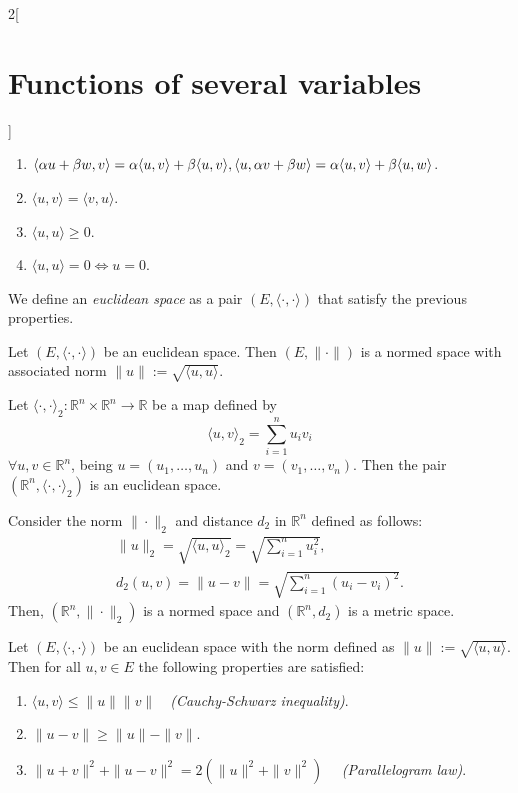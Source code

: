 \documentclass[class=article,10pt,crop=false]{standalone}
\begin{document}
\begin{multicols}{2}[\section{Functions of several variables}]
\begin{definition}
\begin{enumerate}
    \item $\langle \alpha u+\beta w,v\rangle=\alpha\langle u,v\rangle+\beta\langle u,v\rangle,\\\langle u,\alpha v+\beta w\rangle=\alpha\langle u,v\rangle+\beta\langle u,w\rangle$.
    \item $\langle u,v\rangle=\langle v,u\rangle$.
    \item $\langle u,u\rangle\geq 0$.
    \item $\langle u,u\rangle=0\iff u=0$.
\end{enumerate}
We define an \textit{euclidean space} as a pair $(E,\langle\cdot,\cdot\rangle)$ that satisfy the previous properties.
\end{definition}
\begin{prop}
Let $(E,\langle\cdot,\cdot\rangle)$ be an euclidean space. Then $(E,\|\cdot\|)$ is a normed space with associated norm $\|u\|:=\sqrt{\langle u,u\rangle}$.
\end{prop}
\begin{prop}
Let $\langle\cdot,\cdot\rangle_2:\mathbb{R}^n\times\mathbb{R}^n\rightarrow\mathbb{R}$ be a map defined by $$\langle u,v\rangle_2=\sum_{i=1}^nu_iv_i$$ $\forall u,v\in \mathbb{R}^n$, being $u=(u_1,\ldots,u_n)$ and $v=(v_1,\ldots,v_n)$. Then the pair $(\mathbb{R}^n,\langle\cdot,\cdot\rangle_2)$ is an euclidean space.
\end{prop}
\begin{corollary}
Consider the norm $\|\cdot\|_2$ and distance $d_2$ in $\mathbb{R}^n$ defined as follows:
\begin{gather*}
    \|u\|_2=\sqrt{\langle u,u\rangle_2}=\sqrt{\sum_{i=1}^nu_i^2},\\
    d_2(u,v)=\|u-v\|=\sqrt{\sum_{i=1}^n(u_i-v_i)^2}.
\end{gather*}
Then, $(\mathbb{R}^n,\|\cdot\|_2)$ is a normed space and $(\mathbb{R}^n,d_2)$ is a metric space.
\end{corollary}
\begin{prop}
Let $(E,\langle\cdot,\cdot\rangle)$ be an euclidean space with the norm defined as $\|u\|:=\sqrt{\langle u,u\rangle}$. Then for all $u,v\in E$ the following properties are satisfied:
\begin{enumerate}
    \item $\langle u,v\rangle\leq\|u\|\|v\|\quad$\textit{(Cauchy-Schwarz inequality)}.
    \item $\|u-v\|\geq\|u\|-\|v\|$.
    \item $\|u+v\|^2+\|u-v\|^2=2(\|u\|^2+\|v\|^2)\quad$ \textit{(Parallelogram law)}.

\end{enumerate}
\end{prop}
\end{multicols}
\end{document}
